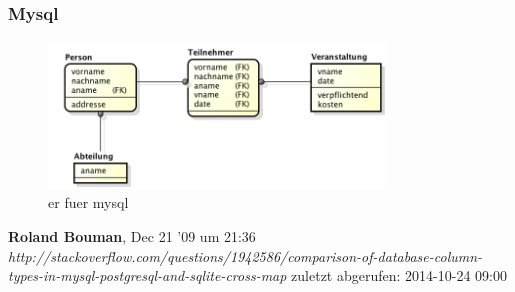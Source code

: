 \documentclass[12pt]{article}
\begin{document}
\subsubsection{Mysql}
\begin{figure}[here!]
\centering
\includegraphics[width=0.8\textwidth]{images/ERD_mysql.png}
\caption{\gls{er} fuer mysql}
\end{figure}
\FloatBarrier

\newpage
\listoffigures
\printglossaries
\begin{thebibliography}{56}


  \textbf{Roland Bouman}, Dec 21 '09 um 21:36\\
  \textit{http://stackoverflow.com/questions/1942586/comparison-of-database-column-types-in-mysql-postgresql-and-sqlite-cross-map}
  \newline zuletzt abgerufen: 2014-10-24 09:00
\end{thebibliography}
\newpage
\end{document}
